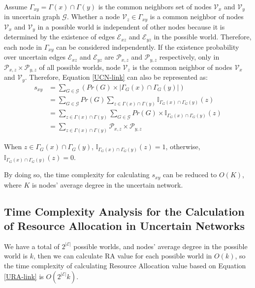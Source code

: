 \documentclass[\main/thesis.tex]{subfiles}
\begin{document}
Assume $\Gamma_{xy} = \Gamma(x)\cap\Gamma(y)$ is the common neighbors set of nodes $\mathcal{V}_x$ and $\mathcal{V}_y$ in uncertain graph $\mathcal{G}$. Whether a node $\mathcal{V}_z \in \Gamma_{xy}$ is a common neighbor of nodes $\mathcal{V}_x$ and $\mathcal{V}_y$ in a possible world is independent of other nodes because it is determined by the existence of edges $\mathcal{E}_{xz}$ and $\mathcal{E}_{yz}$ in the possible world. Therefore, each node in $\Gamma_{xy}$ can be considered independently. If the existence probability over uncertain edges $\mathcal{E}_{xz}$ and $\mathcal{E}_{yz}$ are $\mathcal{P}_{x,z}$ and $\mathcal{P}_{y,z}$ respectively, only in $\mathcal{P}_{x,z}\times\mathcal{P}_{y,z}$ of all possible worlds, node $\mathcal{V}_z$ is the common neighbor of nodes $\mathcal{V}_x$ and $\mathcal{V}_y$. Therefore, Equation \ref{UCN-link} can also be represented as:
\begin{align*}
s_{xy}&=\sum_{G\in \mathcal{G}}( Pr(G)\times|\Gamma_G(x)\cap\Gamma_G(y)|)\\
&=\sum_{G\in \mathcal{G}}Pr(G)\sum_{z\in \Gamma(x)\cap\Gamma(y)}\mathbb{I}_{\Gamma_G(x)\cap\Gamma_G(y)}(z)\\
&=\sum_{z\in \Gamma(x)\cap\Gamma(y)}\sum_{G\in \mathcal{G}}Pr(G)\times\mathbb{I}_{\Gamma_G(x)\cap\Gamma_G(y)}(z)\\
&=\sum_{z\in \Gamma(x)\cap\Gamma(y)}\mathcal{P}_{x,z}\times\mathcal{P}_{y,z}
\end{align*}

When $z\in \Gamma_G(x)\cap\Gamma_G(y)$, $\mathbb{I}_{\Gamma_G(x)\cap\Gamma_G(y)}(z)=1$, otherwise, $\mathbb{I}_{\Gamma_G(x)\cap\Gamma_G(y)}(z)=0$.

By doing so, the time complexity for calculating $s_{xy}$ can be reduced to $O(K)$, where $K$ is nodes' average degree in the uncertain network.
\subsection{Time Complexity Analysis for the Calculation of Resource Allocation in Uncertain Networks}
We have a total of $2^{|\mathcal{E}|}$ possible worlds, and nodes' average degree in the possible world is $k$, then we can calculate RA value for each possible world in $O(k)$, so the time complexity of calculating Resource Allocation value based on Equation \ref{URA-link} is $O(2^{|\mathcal{E}|}k)$.
\end{document}
